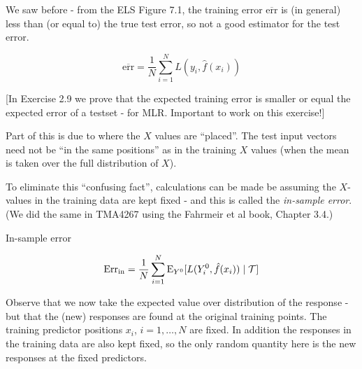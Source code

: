 \documentclass[
  ignorenonframetext,
]{beamer}
\begin{document}
\begin{frame}

We saw before - from the ELS Figure 7.1, the training error
\(\overline{\text{err}}\) is (in general) less than (or equal to) the
true test error, so not a good estimator for the test error.

\[\overline{\text{err}}=\frac{1}{N} \sum_{i=1}^N L(y_i,\hat{f}(x_i))\]

{[}In Exercise 2.9 we prove that the expected training error is smaller
or equal the expected error of a testset - for MLR. Important to work on
this exercise!{]}

Part of this is due to where the \(X\) values are ``placed''. The test
input vectors need not be ``in the same positions'' as in the training
\(X\) values (when the mean is taken over the full distribution of
\(X\)).

To eliminate this ``confusing fact'', calculations can be made be
assuming the \(X\)-values in the training data are kept fixed - and this
is called the \emph{in-sample error}. (We did the same in TMA4267 using
the Fahrmeir et al book, Chapter 3.4.)

\end{frame}

\begin{frame}

\begin{block}{In-sample error}

\[\text{Err}_{\text{in}}=\frac{1}{N}\sum_{i=1}^N \text{E}_{Y^0}[L(Y_i^0,\hat{f}(x_i))\mid {\cal T}]\]

Observe that we now take the expected value over distribution of the
response - but that the (new) responses are found at the original
training points. The training predictor positions \(x_i\),
\(i=1,\ldots, N\) are fixed. In addition the responses in the training
data are also kept fixed, so the only random quantity here is the new
responses at the fixed predictors.

\end{block}

\end{frame}
\end{document}
